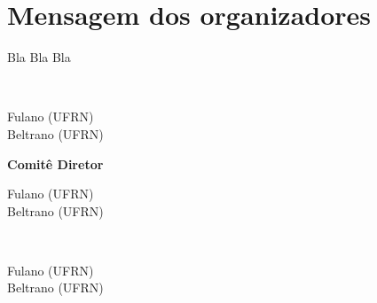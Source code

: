 \documentclass[twoside]{article}
\def\blankpage{%
\clearpage%
\thispagestyle{empty}%
\addtocounter{page}{-1}%
\null%
\clearpage}
\begin{document}


\blankpage






\section*{Mensagem dos organizadores}

Bla Bla Bla


\blankpage

\Large {}\\
\normalsize 
\begin{multicols}{2}
	Fulano (UFRN)\\
	Beltrano (UFRN)\\
\end{multicols}

\Large \textbf{Comitê Diretor}\\
\normalsize
\begin{multicols}{2}
	Fulano (UFRN)\\
	Beltrano (UFRN)\\
\end{multicols}

\Large {}\\
\normalsize 

\begin{multicols}{2}
	Fulano (UFRN)\\
	Beltrano (UFRN)\\
\end{multicols}
\blankpage

\renewcommand{\contentsname}{Sumário}
\tableofcontents
\newpage


{}

\end{document}
